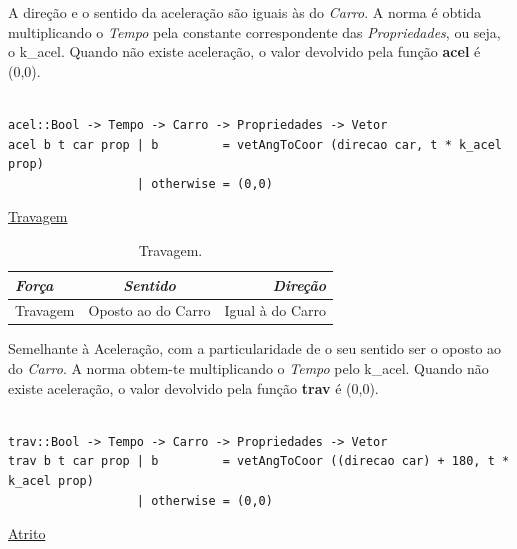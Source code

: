 \documentclass[a4paper]{report} %
\begin{document}
A direção e o sentido da aceleração são iguais às do \emph{Carro}. A norma é obtida multiplicando o \emph{Tempo} pela constante correspondente das \emph{Propriedades}, ou seja, o k_acel. Quando não existe aceleração, o valor devolvido pela função \textbf{acel} é (0,0).

\begin{verbatim}

acel::Bool -> Tempo -> Carro -> Propriedades -> Vetor  
acel b t car prop | b         = vetAngToCoor (direcao car, t * k_acel prop)
                  | otherwise = (0,0)

\end{verbatim}

\newpage

\maketitle\underline{Travagem}

\begin{table}[!h]
\begin{center}
\begin{tabular}{|l|c|r|}
    
    \hline
  \emph{Força} & \emph{Sentido} & \emph{Direção} \\
    \hline
  Travagem & Oposto ao do Carro & Igual à do Carro \\
    \hline

\end{tabular}
\end{center}
\caption{Travagem.}
\end{table}

Semelhante à Aceleração, com a particularidade de o seu sentido ser o oposto ao do \emph{Carro}. A norma obtem-te multiplicando o \emph{Tempo} pelo k_acel. Quando não existe aceleração, o valor devolvido pela função \textbf{trav} é (0,0).

\begin{verbatim}

trav::Bool -> Tempo -> Carro -> Propriedades -> Vetor
trav b t car prop | b         = vetAngToCoor ((direcao car) + 180, t * k_acel prop)
                  | otherwise = (0,0)

\end{verbatim}

\maketitle\underline{Atrito}
\end{document}
